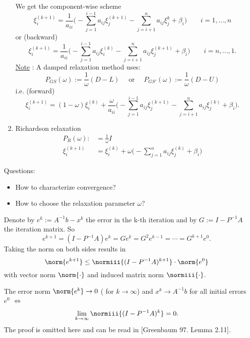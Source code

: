 \begin{enumerate}[label=\Alph{enumi})]
		We get the component-wise scheme
		\[
			\xi _{i}^{(k+1)}=\frac{1}{a_{ii}} \Big( -\sum_{j=1}^{i-1}{a_{ij}} \xi _{j}^{(k+1)}-\sum_{j=i+1}^{n}{a_{ij}\xi _{j}^{k}} + \beta _{i} \Big) \qquad i=1, \ldots, n
		\] 
		or (backward)
		\[
			\xi _{i}^{(k+1)} = \frac{1}{a_{ii}} \Big( -\sum_{j=1}^{i-1}{a_{ij}\xi _{i}^{(k)}}-\sum_{j=i+1}^{n}{a_{ij}\xi _{j}^{(k+1)}} + \beta _{i} \Big) \qquad i=n, \ldots ,1
		.\] 
		\underline{Note} : A damped relaxation method uses:
		\[
			P_{GS}(\omega ) := \frac{1}{\omega }(D-L) \quad \text{ or } \quad P_{GS'}(\omega ) := \frac{1}{\omega }(D-U)
		\] 
		i.e. (forward)
		\[
			\xi _{i}^{(k+1)} = (1-\omega )\xi _{i}^{(k)} + \frac{\omega }{a_{ii}} \Big( -\sum_{j=1}^{i-1}{a_{ij}\xi _{j}^{(k+1)}} - \sum_{j=i+1}^{n}{a_{ij}\xi _{j}^{(k)}} + \beta _{i} \Big) 
		.\] 
	\item Richardson relaxation
		\begin{align*}
			P_{R}(\omega ) :&= \frac{1}{\omega } I \\
			\xi _{i}^{(k+1)} &= \xi _{i}^{(k)} + \omega \Big( -\sum_{j=1}^{n}{a_{ij}\xi _{j}^{(k)}} + \beta _{i} \Big) 
		\end{align*}
\end{enumerate}
		Questions:
		\begin{itemize}
			\item How to characterize convergence?
			\item How to choose the relaxation parameter $\omega $?
		\end{itemize}

		Denote by $e^{k} := A^{-1}b - x^{k}$ the error in the k-th iteration and by $G:=I-P^{-1}A$ the iteration matrix. So
		\[
			e^{k+1}= (I-P^{-1}A)e^{k} = Ge^{k} = G^{2}e^{k-1} = \cdots = G^{k+1}e^{0}
		.\] 
		Taking the norm on both sides results in
		\[
			\norm{e^{k+1}}  \leq \normiii{(I-P^{-1}A)^{k+1}} \cdot \norm{e^{0}} 
		\] 
		with vector norm $\norm{\cdot}$ and induced matrix norm $\normiii{\cdot}$.
		\begin{lemma}
		\label{thm:richardconvergencelemma}
		The error norm $\norm{e^{k}} \rightarrow 0$ ( for $k \rightarrow \infty$) and $x^{k} \rightarrow A^{-1}b$ for all initial errors $e^{0}$ $\iff$
		\[
			\lim_{k \to \infty} \normiii{(I-P^{-1}A)^{k}} = 0
		.\] 
		The proof is omitted here and can be read in 
		[Greenbaum 97. Lemma 2.11].
		\end{lemma}

